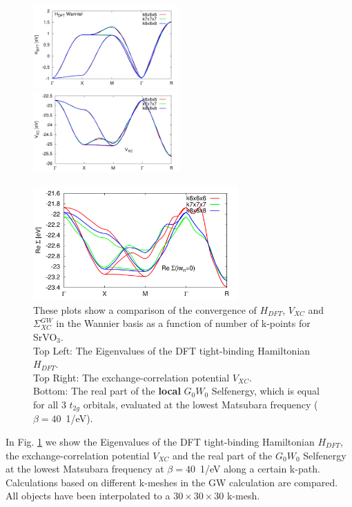 \documentclass[12pt,a4paper]{scrartcl}
\numberwithin{equation}{section}
\begin{document}
\begin{figure}[h]
\includegraphics[width=0.5\textwidth]{figs/kmesh/hdft_kpath.pdf}
\includegraphics[width=0.5\textwidth]{figs/kmesh/vxc_kpath.pdf}
\begin{center}
\includegraphics[width=0.7\textwidth]{figs/kmesh/ReSigma_kpath.pdf}
\end{center}
\caption{
These plots show a comparison of the convergence of $H_{DFT}$, $V_{XC}$ and
$\Sigma^{GW}_{XC}$ in the Wannier basis as a function of number of k-points for SrVO$_3$.\\
Top Left: The Eigenvalues of the DFT tight-binding Hamiltonian $H_{DFT}$.\\
Top Right: The exchange-correlation potential $V_{XC}$. \\
Bottom: The real part of the \textbf{local} $G_0W_0$ Selfenergy, which is equal for 
all 3 $t_{2g}$ orbitals, evaluated at the lowest Matsubara frequency ($\beta=40$\ 1/eV). }
\label{fig:gw_kpath_kmesh_comp}
\end{figure}


In Fig. \ref{fig:gw_kpath_kmesh_comp} we show 
the Eigenvalues of the DFT tight-binding Hamiltonian $H_{DFT}$,
the exchange-correlation potential $V_{XC}$ and the real part of the $G_0W_0$ 
Selfenergy at the lowest Matsubara frequency at $\beta=40$\ 1/eV
along a certain k-path. Calculations based on different k-meshes in the GW calculation
are compared.
All objects have been interpolated to a $30\times30\times30$ k-mesh.
\end{document}
